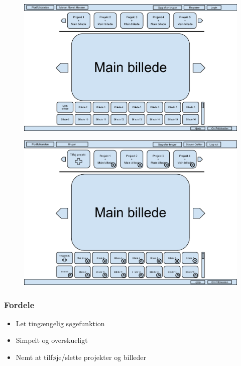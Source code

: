 \documentclass[a4paper,titlepage,fleqn,12pt]{article}
\begin{document}
\begin{figure}[H]
\includegraphics[width=\textwidth]{Prototype_1_not_logged_in.png}
\end{figure}

\begin{figure}[H]
\includegraphics[width=\textwidth]{Prototype_1_logged_in.png}
\end{figure}

\subsubsection{Fordele}
\begin{itemize}
\item Let tingængelig søgefunktion
\item Simpelt og overskueligt
\item Nemt at tilføje/slette projekter og billeder
\end{itemize}
\end{document}
